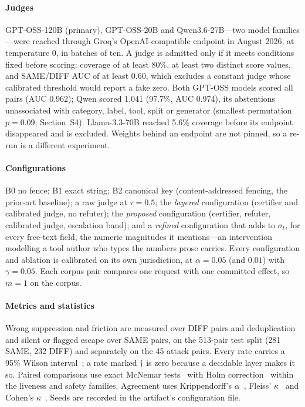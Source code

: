 \paragraph{Judges}
GPT-OSS-120B (primary), GPT-OSS-20B and Qwen3.6-27B---two model families---were reached through Groq's OpenAI-compatible endpoint in August 2026, at temperature 0, in batches of ten. A judge is admitted only if it meets conditions fixed before scoring: coverage of at least 80\%, at least two distinct score values, and SAME/DIFF AUC of at least 0.60, which excludes a constant judge whose calibrated threshold would report a fake zero. Both GPT-OSS models scored all pairs (AUC 0.962); Qwen scored 1,041 (97.7\%, AUC 0.974), its abstentions unassociated with category, label, tool, split or generator (smallest permutation $p=0.09$; Section~S4). Llama-3.3-70B reached 5.6\% coverage before its endpoint disappeared and is excluded. Weights behind an endpoint are not pinned, so a re-run is a different experiment.

\paragraph{Configurations}
B0 no fence; B1 exact string; B2 canonical key (content-addressed fencing, the prior-art baseline); a raw judge at $\tau=0.5$; the \emph{layered} configuration (certifier and calibrated judge, no refuter); the \emph{proposed} configuration (certifier, refuter, calibrated judge, escalation band); and a \emph{refined} configuration that adds to $\sigma_t$, for every free-text field, the numeric magnitudes it mentions---an intervention modelling a tool author who types the numbers prose carries. Every configuration and ablation is calibrated on its own jurisdiction, at $\alpha=0.05$ (and $0.01$) with $\gamma=0.05$. Each corpus pair compares one request with one committed effect, so $m=1$ on the corpus.

\paragraph{Metrics and statistics}
Wrong suppression and friction are measured over DIFF pairs and deduplication and silent or flagged escape over SAME pairs, on the 513-pair test split (281 SAME, 232 DIFF) and separately on the 45 attack pairs. Every rate carries a 95\% Wilson interval~\cite{wilson1927}; a rate marked $\dagger$ is zero because a decidable layer makes it so. Paired comparisons use exact McNemar tests~\cite{mcnemar1947} with Holm correction~\cite{holm1979} within the liveness and safety families. Agreement uses Krippendorff's $\alpha$~\cite{krippendorff2004}, Fleiss' $\kappa$~\cite{fleiss1971} and Cohen's $\kappa$~\cite{cohen1960}. Seeds are recorded in the artifact's configuration file.


